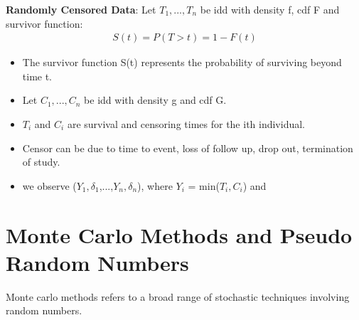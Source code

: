 \documentclass[12pt, oneside]{article}
\begin{document}
\begin{itemize}
 \textbf{Randomly Censored Data}: Let $T_1,...,T_n$ be idd with density f, cdf F and survivor function:
 \begin{align*}
     S(t) = P(T > t) = 1 - F(t)
 \end{align*}
 
 \begin{itemize}
     \item The survivor function S(t) represents the probability of surviving beyond time t.
     \item Let $C_1,...,C_n$ be idd with density g and cdf G. 
     \item $T_i$ and $C_i$ are survival and censoring times for the ith individual. 
     \item Censor can be due to time to event, loss of follow up, drop out, termination of study. 
     \item we observe ($Y_1, \delta_1$,...,$Y_n, \delta_n$), where $Y_i$ = min($T_i, C_i$) and
     
\end{itemize}
\end{itemize}


\section{Monte Carlo Methods and Pseudo Random Numbers}
Monte carlo methods refers to a broad range of stochastic techniques involving random numbers. 
\end{document}
